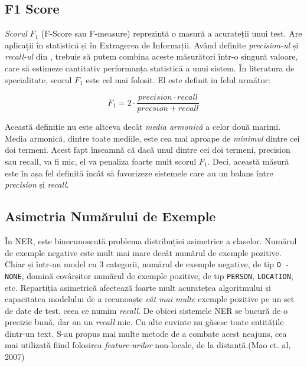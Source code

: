\subsection{F1 Score}

\textit{Scorul} $F_1$ (F-Score sau F-measure) reprezintă o masură a acurateții unui test. Are aplicații în statistică și în Extragerea de Informații. Având definite \textit{precision-ul} și \textit{recall-ul} din , trebuie să putem combina aceste măsurători într-o singură valoare, care să estimeze cantitativ performanța statistică a unui sistem. În literatura de specialitate, scorul $F_1$ este cel mai folosit. El este definit in felul următor:

\begin{equation}
F_{1} = 2 \cdot \frac{precision \cdot recall}{precsion + recall}
\end{equation}

Această definiție nu este altceva decât \textit{media armonică} a celor două marimi. Media armonică, dintre toate mediile, este cea mai aproape de \textit{minimul} dintre cei doi termeni. Acest fapt înseamnă că dacă unul dintre cei doi termeni, precision sau recall, va fi mic, el va penaliza foarte mult scorul $F_1$. Deci, această măsură este în așa fel definită încât să favorizeze sistemele care au un balans între \textit{precision} și \textit{recall}.

\subsection{Asimetria Numărului de Exemple}
\label{subsec:example-assymetry}

În NER, este binecunoscută problema distribuției asimetrice a claselor. Numărul de exemple negative este mult mai mare decât numărul de exemple pozitive. Chiar și într-un model cu 3 categorii, numărul de exemple negative, de tip \texttt{O - NONE}, domină covârșitor numărul de exemple pozitive, de tip \texttt{PERSON}, \texttt{LOCATION}, etc. Repartiția asimetrică afectează foarte mult acuratețea algoritmului și capacitatea modelului de a recunoaște \textit{cât mai multe} exemple pozitive pe un set de date de test, ceea ce numim \textit{recall}. De obicei sistemele NER se bucură de o precizie bună, dar au un \textit{recall} mic. Cu alte cuvinte nu găsesc toate entitățile dintr-un text. S-au propus mai multe metode de a combate acest neajuns, cea mai utilizată fiind folosirea \textit{feature-urilor} non-locale, de la distanță.(Mao et. al, 2007)\cite{Mao2007}

